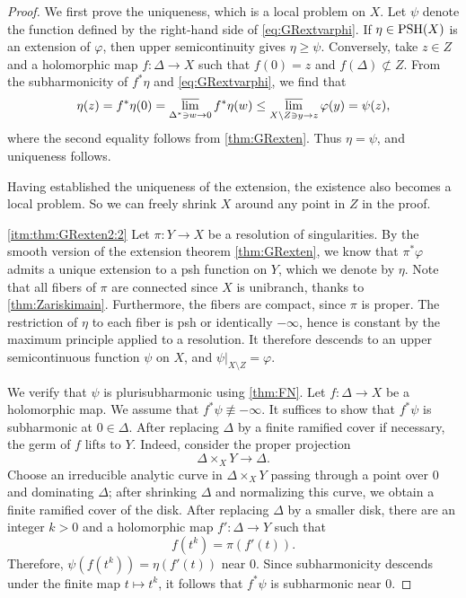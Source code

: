 \begin{proof}
    We first prove the uniqueness, which is a local problem on $X$. Let $\psi$ denote the function defined by the right-hand side of \eqref{eq:GRextvarphi}. If $\eta\in\mathrm{PSH}(X)$ is an extension of $\varphi$, then upper semicontinuity gives $\eta\geq\psi$. Conversely, take $z\in Z$ and a holomorphic map $f\colon \Delta\rightarrow X$ such that $f(0)=z$ and $f(\Delta)\not\subset Z$. From the subharmonicity of $f^*\eta$ and \eqref{eq:GRextvarphi}, we find that
    \[
    \eta(z)=f^*\eta(0)=\varlimsup_{\Delta^* \ni w\to 0}f^*\eta(w)\leq \varlimsup_{X\setminus Z\ni y\to z}\varphi(y)=\psi(z),
    \]
    where the second equality follows from \cref{thm:GRexten}. Thus $\eta=\psi$, and uniqueness follows.

    Having established the uniqueness of the extension, the existence also becomes a local problem. So we can freely shrink $X$ around any point in $Z$ in the proof.

    \ref{itm:thm:GRexten2:2}
    Let $\pi\colon Y\rightarrow X$ be a resolution of singularities.
    By the smooth version of the extension theorem \cref{thm:GRexten}, we know that $\pi^*\varphi$ admits a unique extension to a psh function on $Y$, which we denote by $\eta$.
    Note that all fibers of $\pi$ are connected since $X$ is unibranch, thanks to \cref{thm:Zariskimain}. Furthermore, the fibers are compact, since $\pi$ is proper.
    The restriction of $\eta$ to each fiber is psh or identically $-\infty$, hence is constant by the maximum principle applied to a resolution. It therefore descends to an upper semicontinuous function $\psi$ on $X$, and $\psi|_{X\setminus Z}=\varphi$.

    We verify that $\psi$ is plurisubharmonic using \cref{thm:FN}. Let $f\colon \Delta\rightarrow X$ be a holomorphic map. We assume that $f^*\psi\not\equiv -\infty$.
    It suffices to show that $f^*\psi$ is subharmonic at $0\in \Delta$. After replacing $\Delta$ by a finite ramified cover if necessary, the germ of $f$ lifts to $Y$. Indeed, consider the proper projection
    \[
        \Delta\times_X Y\longrightarrow \Delta.
    \]
    Choose an irreducible analytic curve in $\Delta\times_X Y$ passing through a point over $0$ and dominating $\Delta$; after shrinking $\Delta$ and normalizing this curve, we obtain a finite ramified cover of the disk. After replacing $\Delta$ by a smaller disk, there are an integer $k>0$ and a holomorphic map $f'\colon \Delta\to Y$ such that
    \[
        f(t^k)=\pi(f'(t)).
    \]
    Therefore, $\psi(f(t^k))=\eta(f'(t))$ near $0$. Since subharmonicity descends under the finite map $t\mapsto t^k$, it follows that $f^*\psi$ is subharmonic near $0$.


\end{proof}
